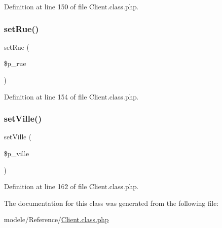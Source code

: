 Definition at line 150 of file Client.\+class.\+php.

\mbox{\label{class_client_a8c33cc68eacb9d49e95deb3e38779efd}} 
\subsubsection{\texorpdfstring{set\+Rue()}{setRue()}}
{\footnotesize\ttfamily set\+Rue (\begin{DoxyParamCaption}\item[{}]{\$p\+\_\+rue }\end{DoxyParamCaption})}



Definition at line 154 of file Client.\+class.\+php.

\mbox{\label{class_client_aaf173582a36fb4ebca1b382c302556d3}} 
\subsubsection{\texorpdfstring{set\+Ville()}{setVille()}}
{\footnotesize\ttfamily set\+Ville (\begin{DoxyParamCaption}\item[{}]{\$p\+\_\+ville }\end{DoxyParamCaption})}



Definition at line 162 of file Client.\+class.\+php.



The documentation for this class was generated from the following file\+:\begin{DoxyCompactItemize}
\item 
modele/\+Reference/\hyperlink{_client_8class_8php}{Client.\+class.\+php}\end{DoxyCompactItemize}
